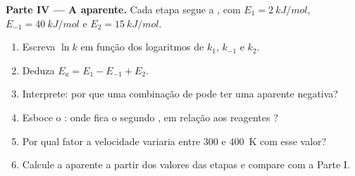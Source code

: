 \begin{problem}
\medskip
\noindent\textbf{Parte IV --- A  aparente.}
Cada etapa segue a , com  $E_1 =
\qty{2}{kJ/mol}$, $E_{-1} = \qty{40}{kJ/mol}$ e $E_2 =
\qty{15}{kJ/mol}$.
\begin{enumerate}[resume]
  \item Escreva $\ln k$ em função dos logaritmos de $k_1$, $k_{-1}$ e
        $k_2$.
  \item Deduza $E_a = E_1 - E_{-1} + E_2$.
  \item Interprete: por que uma combinação de  pode ter
        uma  aparente negativa?
  \item Esboce o : onde fica o segundo , em relação aos reagentes ?
  \item Por qual fator a velocidade variaria entre 300 e \qty{400}{K}
        com esse valor?
  \item Calcule a  aparente a partir dos valores das
        etapas e compare com a Parte I.
\end{enumerate}
\end{problem}

